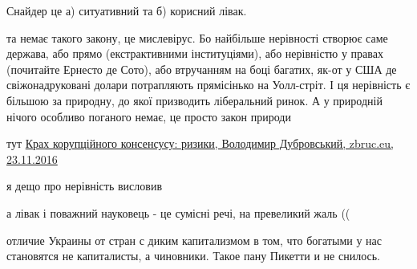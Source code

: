 \begin{itemize}
\begin{itemize}
Снайдер це а) ситуативний та б) корисний лівак.

 

та немає такого закону, це мислевірус. Бо найбільше нерівності створює саме
держава, або прямо (екстрактивними інституціями), або нерівністю у правах
(почитайте Ернесто де Сото), або втручанням на боці багатих, як-от у США де
свіжонадруковані долари потрапляють прямісінько на Уолл-стріт. І ця нерівність
є більшою за природну, до якої призводить ліберальний ринок. А у природній
нічого особливо поганого немає, це просто закон природи

 
тут 
\href{https://zbruc.eu/node/59044}{%
Крах корупційного консенсусу: ризики, Володимир Дубровський, zbruc.eu, 23.11.2016%
}

я дещо про нерівність висловив

 
а лівак і поважний науковець - це сумісні речі, на превеликий жаль ((

 

отличие Украины от стран с диким капитализмом в том, что богатыми у нас
становятся не капиталисты, а чиновники. Такое пану Пикетти и не снилось.


 

\end{itemize}
\end{itemize}
